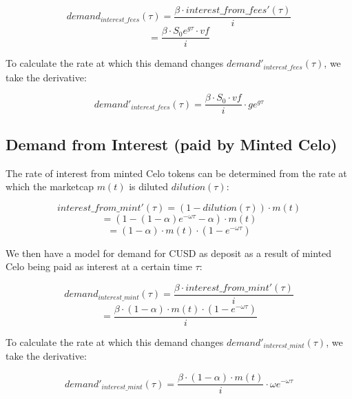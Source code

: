 \begin{equation}
    demand_{interest\_fees}(\tau) = \frac{\beta \cdot interest\_from\_fees'(\tau)}{i}
\end{equation}
\begin{equation}
    = \frac{\beta \cdot S_0e^{g\tau}\cdot vf}{i}
\end{equation}

To calculate the rate at which this demand changes $demand'_{interest\_fees}(\tau)$, we take the derivative:

\begin{equation}
    demand'_{interest\_fees}(\tau) = \frac{\beta \cdot S_0\cdot vf}{i} \cdot ge^{g\tau}
\end{equation}



\subsection{Demand from Interest (paid by Minted Celo)}

The rate of interest from minted Celo tokens can be determined from the rate at which the marketcap $m(t)$ is diluted $dilution(\tau)$:

\begin{equation}
    interest\_from\_mint'(\tau) = (1-dilution(\tau)) \cdot m(t)
\end{equation}
\begin{equation}
    = (1 - (1-\alpha)e^{-\omega\tau} - \alpha) \cdot m(t)
\end{equation}
\begin{equation}
    = (1 - \alpha)\cdot m(t) \cdot (1 - e^{-\omega\tau})
\end{equation}

We then have a model for demand for CUSD as deposit as a result of minted Celo being paid as interest at a certain time $\tau$:

\begin{equation}
    demand_{interest\_mint}(\tau) = \frac{\beta \cdot interest\_from\_mint'(\tau)}{i}
\end{equation}
\begin{equation}
    = \frac{\beta \cdot (1 - \alpha)\cdot m(t) \cdot (1 - e^{-\omega\tau})}{i}
\end{equation}

To calculate the rate at which this demand changes $demand'_{interest\_mint}(\tau)$, we take the derivative:

\begin{equation}
    demand'_{interest\_mint}(\tau) = \frac{\beta \cdot (1 - \alpha)\cdot m(t)}{i} \cdot \omega e^{-\omega\tau}
\end{equation}


